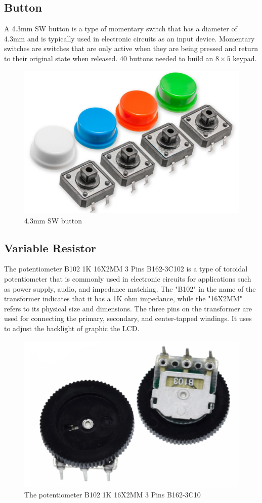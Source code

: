 \documentclass[a4paper, twoside]{report}
\begin{document}
\subsection{Button}
A 4.3mm SW button is a type of momentary switch that has a diameter of 4.3mm and is typically used in electronic circuits as an input device. Momentary switches are switches that are only active when they are being pressed and return to their original state when released. 40 buttons needed to build an $8 \times 5$ keypad.
\begin{figure}[H]
    \begin{center}
    \includegraphics[width=.45\textwidth]{images/button.jpg}
    \caption{4.3mm SW button}
    \end{center} 
\end{figure}
\subsection{Variable Resistor}
The potentiometer B102 1K 16X2MM 3 Pins B162-3C102 is a type of toroidal potentiometer that is commonly used in electronic circuits for applications such as power supply, audio, and impedance matching. The "B102" in the name of the transformer indicates that it has a 1K ohm impedance, while the "16X2MM" refers to its physical size and dimensions. The three pins on the transformer are used for connecting the primary, secondary, and center-tapped windings. It uses to adjust the backlight of graphic the LCD.
\begin{figure}[H]
    \begin{center}
    \includegraphics[width=.35\textwidth]{images/Variable_resistor.png}
    \caption{The potentiometer B102 1K 16X2MM 3 Pins B162-3C10}
    \end{center} 
\end{figure}
\end{document}
